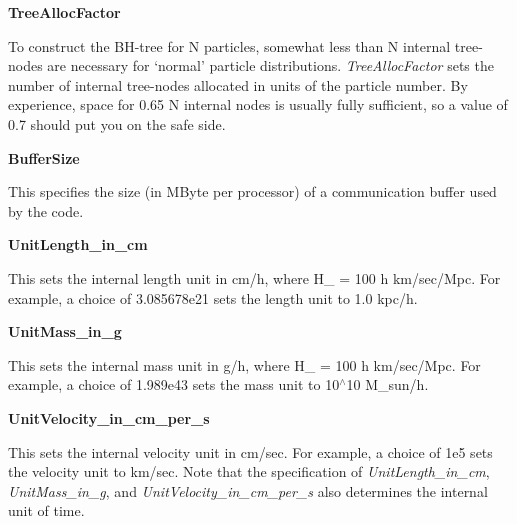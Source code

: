 \begin{DoxyItemize}
\item {\bfseries TreeAllocFactor} \par
 To construct the BH-\/tree for N particles, somewhat less than N internal tree-\/nodes are necessary for `normal' particle distributions. {\itshape TreeAllocFactor\/} sets the number of internal tree-\/nodes allocated in units of the particle number. By experience, space for 0.65 N internal nodes is usually fully sufficient, so a value of 0.7 should put you on the safe side.
\end{DoxyItemize}


\begin{DoxyItemize}
\item {\bfseries BufferSize} \par
 This specifies the size (in MByte per processor) of a communication buffer used by the code.
\end{DoxyItemize}


\begin{DoxyItemize}
\item {\bfseries UnitLength\_\-in\_\-cm} \par
 This sets the internal length unit in cm/h, where H\_ = 100 h km/sec/Mpc. For example, a choice of 3.085678e21 sets the length unit to 1.0 kpc/h.
\end{DoxyItemize}


\begin{DoxyItemize}
\item {\bfseries UnitMass\_\-in\_\-g} \par
 This sets the internal mass unit in g/h, where H\_ = 100 h km/sec/Mpc. For example, a choice of 1.989e43 sets the mass unit to 10$^\wedge$10 M\_\-sun/h.
\end{DoxyItemize}


\begin{DoxyItemize}
\item {\bfseries UnitVelocity\_\-in\_\-cm\_\-per\_\-s} \par
 This sets the internal velocity unit in cm/sec. For example, a choice of 1e5 sets the velocity unit to km/sec. Note that the specification of {\itshape UnitLength\_\-in\_\-cm\/}, {\itshape UnitMass\_\-in\_\-g\/}, and {\itshape UnitVelocity\_\-in\_\-cm\_\-per\_\-s\/} also determines the internal unit of time.
\end{DoxyItemize}


